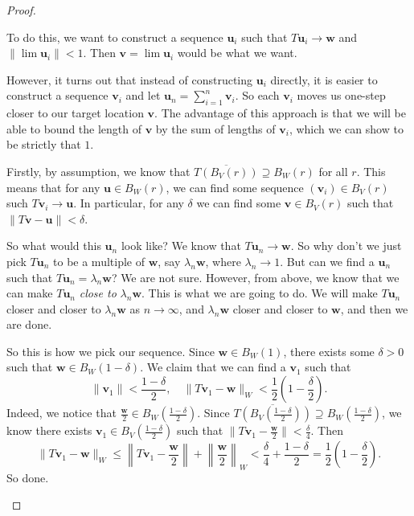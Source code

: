 \documentclass[a4paper]{article}
\begin{document}
\begin{proof}
\begin{enumerate}
      To do this, we want to construct a sequence $\mathbf{u}_i$ such that $T\mathbf{u}_i \to \mathbf{w}$ and $\|\lim \mathbf{u}_i\| < 1$. Then $\mathbf{v} = \lim \mathbf{u}_i$ would be what we want.

      However, it turns out that instead of constructing $\mathbf{u}_i$ directly, it is easier to construct a sequence $\mathbf{v}_i$ and let $\mathbf{u}_n = \sum_{i = 1}^n \mathbf{v}_i$. So each $\mathbf{v}_i$ moves us one-step closer to our target location $\mathbf{v}$. The advantage of this approach is that we will be able to bound the length of $\mathbf{v}$ by the sum of lengths of $\mathbf{v}_i$, which we can show to be strictly that $1$.

      Firstly, by assumption, we know that $\overline{T(B_V(r))} \supseteq B_W(r)$ for all $r$. This means that for any $\mathbf{u}\in B_W(r)$, we can find some sequence $(\mathbf{v}_i)\in B_V(r)$ such $T\mathbf{v}_i \to \mathbf{u}$. In particular, for any $\delta$ we can find some $\mathbf{v}\in B_V(r)$ such that $\|T \mathbf{v} - \mathbf{u}\| < \delta$.

      So what would this $\mathbf{u}_n$ look like? We know that $T\mathbf{u}_n \to \mathbf{w}$. So why don't we just pick $T\mathbf{u}_n$ to be a multiple of $\mathbf{w}$, say $\lambda_n \mathbf{w}$, where $\lambda_n \to 1$. But can we find a $\mathbf{u}_n$ such that $T\mathbf{u}_n = \lambda_n \mathbf{w}$? We are not sure. However, from above, we know that we can make $T\mathbf{u}_n$ \emph{close to} $\lambda_n \mathbf{w}$. This is what we are going to do. We will make $T\mathbf{u}_n$ closer and closer to $\lambda_n \mathbf{w}$ as $n \to \infty$, and $\lambda_n \mathbf{w}$ closer and closer to $\mathbf{w}$, and then we are done.

      So this is how we pick our sequence. Since $\mathbf{w} \in B_W(1)$, there exists some $\delta > 0$ such that $\mathbf{w} \in B_W(1 - \delta)$. We claim that we can find a $\mathbf{v}_1$ such that
      \[
        \|\mathbf{v}_1\| < \frac{1 - \delta}{2}, \quad \|T\mathbf{v}_1 - \mathbf{w}\|_W < \frac{1}{2}\left(1 - \frac{\delta}{2}\right).
      \]
      Indeed, we notice that $\frac{\mathbf{w}}{2} \in B_W(\frac{1 - \delta}{2})$. Since $\overline{T(B_V(\frac{1 - \delta}{2}))} \supseteq B_W(\frac{1 - \delta}{2})$, we know there exists $\mathbf{v}_1 \in B_V\left(\frac{1 - \delta}{2}\right)$ such that $\|T\mathbf{v}_1 - \frac{\mathbf{w}}{2}\| < \frac{\delta}{4}$. Then
      \[
        \|T\mathbf{v}_1 - \mathbf{w}\|_W \leq \left\|T\mathbf{v}_1 - \frac{\mathbf{w}}{2}\right\| + \left\|\frac{\mathbf{w}}{2}\right\|_W < \frac{\delta}{4} + \frac{1 - \delta}{2} = \frac{1}{2}\left(1 - \frac{\delta}{2}\right).
      \]
      So done.


\end{enumerate}
\end{proof}
\end{document}
